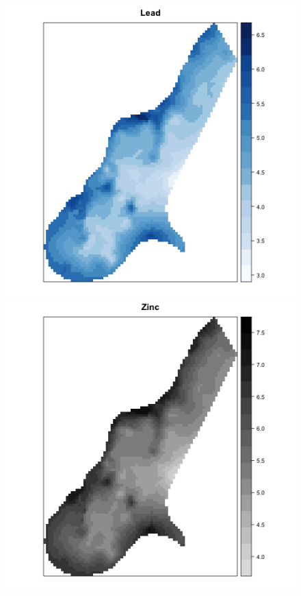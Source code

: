 \begin{figure}[h!]
\begin{center}
\includegraphics[scale=0.35]{images/Meuse_lead_estimate.png}
\includegraphics[scale=0.35]{images/Meuse_zinc_estimate.png}

\end{center}
\end{figure}
